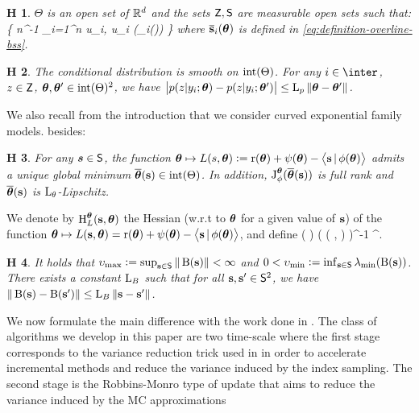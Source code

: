 \documentclass[11pt]{article}
\newtheorem{assumption}{H\!\!}
\theoremstyle{t}
\begin{document}
\begin{assumption}\label{ass:convset}
$\Theta$ is an open set of $\mathbb{R}^d$ and the sets $\mathsf{Z}, \mathsf{S}$ are measurable open sets such that:
\beq
\Sset \supset \left\{  n^{-1} \sum_{i=1}^n u_i, u_i (\overline{\bss}_i(\param))  \right\}
\eeq
where $\overline{{\mathbf{s}}}_i({\bm{\theta}})$ is defined in \eqref{eq:definition-overline-bss}.
\end{assumption}

\begin{assumption}\label{ass:expected}
The conditional distribution is smooth on ${\rm int}(\Theta)$. For any $i \in \inter$, $z \in \mathsf{Z}$, ${\bm{\theta}}, {\bm{\theta}}' \in {\rm int} (\Theta)^2$, we have
$\big| p( z | y_i; {\bm{\theta}} ) - p( z | y_i; {\bm{\theta}}' ) \big| \leq  \operatorname{L}_{p} \| {\bm{\theta}} - {\bm{\theta}}' \|$.
\end{assumption}

We also recall from the introduction that we consider curved exponential family models. besides:
\begin{assumption} \label{ass:reg}
For any $\bm{s} \in \mathsf{S}$, the function ${\bm{\theta}} \mapsto L(s,{\bm{\theta}}) \mathrel{\mathop:}= \operatorname{r}( {\bm{\theta}} ) + \psi( {\bm{\theta}}) - \big\langle {\mathbf{s}}\,|\, \phi ( {\bm{\theta}})  \big\rangle$ admits a unique global minimum $\overline{{\bm{\theta}}}({{\mathbf{s}}}) \in {\rm int}(\Theta)$.
In addition, $\operatorname{J}_{\phi}^{{\bm{\theta}}}(\overline{{\bm{\theta}}}({\mathbf{s}} ))$ is full rank and $\overline{{\bm{\theta}}}( {\mathbf{s}} )$ is $\operatorname{L}_{\theta}$-Lipschitz.
\end{assumption}
We denote by $\operatorname{H}_{L}^{{\bm{\theta}}}({\mathbf{s}},{\bm{\theta}})$ the Hessian (w.r.t to ${\bm{\theta}}$ for a given value of ${\mathbf{s}}$) of the function ${\bm{\theta}} \mapsto L({\mathbf{s}},{\bm{\theta}})= \operatorname{r}({\bm{\theta}}) + \psi({\bm{\theta}}) -\big\langle{\mathbf{s}}\,|\,\phi({\bm{\theta}}) \big\rangle$, and define
\beq\label{eq:Bss}
( \bss ) \eqdef\jacob{ \phi }{ \param }{ \mstep{\bss} } \Big( ( {\bss},  \mstep{\bss} )  \Big)^{-1} \jacob{ \phi }{ \param }{ \mstep{\bss} }^\top.
\eeq
\begin{assumption}\label{ass:eigen}
It holds that $ \upsilon_{\max} \mathrel{\mathop:}= \sup_{{\mathbf{s}} \in \mathsf{S}} \| \operatorname{B}( {\mathbf{s}} ) \| < \infty$ and $0 < \upsilon_{\min}  \mathrel{\mathop:}= \inf_{{\mathbf{s}} \in \mathsf{S}} \lambda_{\rm min} ( \operatorname{B}( {\mathbf{s}} ) )$.
There exists a constant $\operatorname{L}_{B}$ such that for all ${\mathbf{s}}, {\mathbf{s}}' \in \mathsf{S}^2$, we have $ \| \operatorname{B}( {\mathbf{s}} ) - \operatorname{B}( {\mathbf{s}}' )  \| \leq \operatorname{L}_{B} \| {{\mathbf{s}}} - {{\mathbf{s}}}' \|$.
\end{assumption}

We now formulate the main difference with the work done in \citep{karimi2019global}. 
The class of algorithms we develop in this paper are two time-scale where the first stage corresponds to the variance reduction trick used in \citep{karimi2019global} in order to accelerate incremental methods and reduce the variance induced by the index sampling. 
The second stage is the Robbins-Monro type of update that aims to reduce the variance induced by the MC approximations
\end{document}
